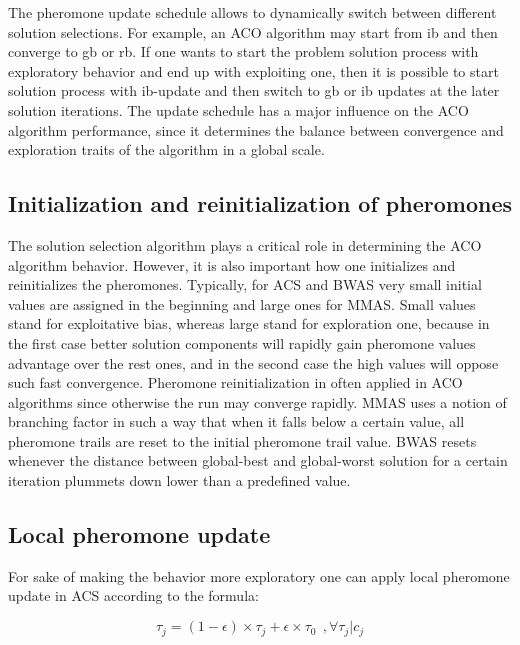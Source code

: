 \documentclass[11pt,a4paper,oneside]{book}
\begin{document}
The pheromone update schedule allows to dynamically switch between different solution selections. For example, an ACO algorithm may start from ib and then converge to gb or rb. If one wants to start the problem solution process with exploratory behavior and end up with exploiting one, then it is possible to start solution process with ib-update and then switch to gb or ib updates at the later solution iterations. The update schedule has a major influence on the ACO algorithm performance, since it determines the balance between convergence and exploration traits of the algorithm in a global scale.



\subsection{Initialization and reinitialization of pheromones}

The solution selection algorithm plays a critical role in determining the ACO algorithm behavior. However, it is also important how one initializes and reinitializes the pheromones. Typically, for ACS and BWAS very small initial values are assigned in the beginning and large ones for MMAS. Small values stand for exploitative bias, whereas large stand for exploration one, because in the first case better solution components will rapidly gain pheromone values advantage over the rest ones, and in the second case the high values will oppose such fast convergence. Pheromone reinitialization in often applied in ACO algorithms since otherwise the run may converge rapidly. MMAS uses a notion of branching factor in such a way that when it falls below a certain value, all pheromone trails are reset to the initial pheromone trail value. BWAS resets whenever the distance between global-best and global-worst solution for a certain iteration plummets down lower than a predefined value.


\subsection{Local pheromone update}
For sake of making the behavior more exploratory one can apply \cite{coop_tsp} local pheromone update in ACS according to the formula:

\begin{equation}
\tau_j = (1 - \epsilon) \times \tau_j + \epsilon \times \tau_0 \ \ ,\forall \tau_j | c_j
\label{eq:local_update}
\end{equation}
\end{document}
